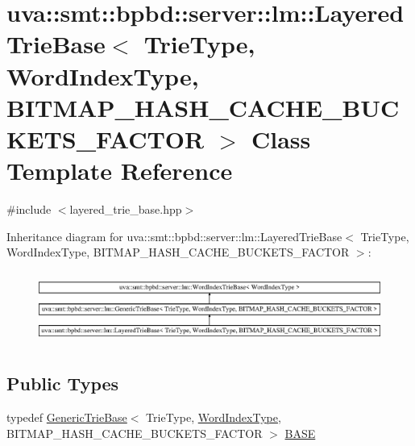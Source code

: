 \hypertarget{classuva_1_1smt_1_1bpbd_1_1server_1_1lm_1_1_layered_trie_base}{}\section{uva\+:\+:smt\+:\+:bpbd\+:\+:server\+:\+:lm\+:\+:Layered\+Trie\+Base$<$ Trie\+Type, Word\+Index\+Type, B\+I\+T\+M\+A\+P\+\_\+\+H\+A\+S\+H\+\_\+\+C\+A\+C\+H\+E\+\_\+\+B\+U\+C\+K\+E\+T\+S\+\_\+\+F\+A\+C\+T\+O\+R $>$ Class Template Reference}
\label{classuva_1_1smt_1_1bpbd_1_1server_1_1lm_1_1_layered_trie_base}


{\ttfamily \#include $<$layered\+\_\+trie\+\_\+base.\+hpp$>$}

Inheritance diagram for uva\+:\+:smt\+:\+:bpbd\+:\+:server\+:\+:lm\+:\+:Layered\+Trie\+Base$<$ Trie\+Type, Word\+Index\+Type, B\+I\+T\+M\+A\+P\+\_\+\+H\+A\+S\+H\+\_\+\+C\+A\+C\+H\+E\+\_\+\+B\+U\+C\+K\+E\+T\+S\+\_\+\+F\+A\+C\+T\+O\+R $>$\+:\begin{figure}[H]
\begin{center}
\leavevmode
\includegraphics[height=2.389758cm]{classuva_1_1smt_1_1bpbd_1_1server_1_1lm_1_1_layered_trie_base}
\end{center}
\end{figure}
\subsection*{Public Types}
\begin{DoxyCompactItemize}
\item 
typedef \hyperlink{classuva_1_1smt_1_1bpbd_1_1server_1_1lm_1_1_generic_trie_base}{Generic\+Trie\+Base}$<$ Trie\+Type, \hyperlink{classuva_1_1smt_1_1bpbd_1_1server_1_1lm_1_1_word_index_trie_base_a77ee32bf3a9f8a89558bda4f2031200c}{Word\+Index\+Type}, B\+I\+T\+M\+A\+P\+\_\+\+H\+A\+S\+H\+\_\+\+C\+A\+C\+H\+E\+\_\+\+B\+U\+C\+K\+E\+T\+S\+\_\+\+F\+A\+C\+T\+O\+R $>$ \hyperlink{classuva_1_1smt_1_1bpbd_1_1server_1_1lm_1_1_layered_trie_base_ae4d802d9849bc0b3dbe9a60c6439a9c9}{B\+A\+S\+E}
\end{DoxyCompactItemize}
